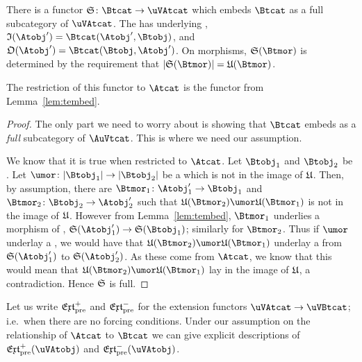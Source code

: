 \documentclass[%
a4paper,%
arxiv,%
defaults
]{myclass}
\begin{document}
\begin{lemma}
\label{lem:tembedx}
There is a functor \(\sfunc \colon \Btcat \to \uVAtcat\) which embeds \(\Btcat\) as a full subcategory of \(\uVAtcat\).
The \uVAtobjalt[\sfunc(\Btobj)] has underlying \uobj[\ufunc(\Btobj)],  \itest \(\itest(\Atobj') = \Hom{\Btcat}{\Atobj'}{\Btobj}\), and \otest \(\otest(\Atobj') = \Hom{\Btcat}{\Btobj}{\Atobj'}\).
On morphisms, \(\sfunc(\Btmor)\) is determined by the requirement that \(\forfunc[\sfunc(\Btmor)] = \ufunc(\Btmor)\).

The restriction of this functor to \(\Atcat\) is the functor from Lemma~\ref{lem:tembed}.
\end{lemma}

\begin{proof}
The only part we need to worry about is showing that \(\Btcat\) embeds as a \emph{full} subcategory of \(\AuVtcat\).
This is where we need our assumption.

We know that it is true when restricted to \(\Atcat\).
Let \(\Btobj_1\) and \(\Btobj_2\) be \Btobjalts.
Let \(\umor \colon \forfunc[\Btobj_1] \to \forfunc[\Btobj_2]\) be a \umor which is not in the image of \(\ufunc\).
Then, by assumption, there are \Btmors \(\Btmor_1 \colon \Atobj_1' \to \Btobj_1\) and \(\Btmor_2 \colon \Btobj_2 \to \Atobj_2'\) such that \(\ufunc(\Btmor_2) \umor \ufunc(\Btmor_1)\) is not in the image of \(\ufunc\).
However from Lemma~\ref{lem:tembed}, \(\Btmor_1\) underlies a morphism of \uVBtobjalts, \(\sfunc(\Atobj_1') \to \sfunc(\Btobj_1)\); similarly for \(\Btmor_2\).
Thus if \(\umor\) underlay a \uVBtmor, we would have that \(\ufunc(\Btmor_2)\umor \ufunc(\Btmor_1)\) underlay a \uVBtmor from \(\sfunc(\Atobj_1')\) to \(\sfunc(\Atobj_2')\).
As these come from \(\Atcat\), we know that this would mean that \(\ufunc(\Btmor_2)\umor \ufunc(\Btmor_1)\) lay in the image of \(\ufunc\), a contradiction.
Hence \(\sfunc\) is full.
\end{proof}

Let us write \(\PJextfunc\) and \(\PMextfunc\) for the extension functors \(\uVAtcat \to \uVBtcat\); i.e.\ when there are no forcing conditions.
Under our assumption on the relationship of \(\Atcat\) to \(\Btcat\) we can give explicit descriptions of \(\PJextfunc(\uVAtobj)\) and \(\PMextfunc(\uVAtobj)\).
\end{document}
